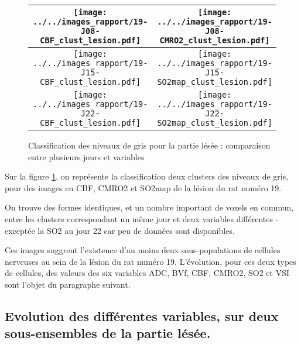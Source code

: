 \begin{figure}[!p]
\begin{center}
\begin{tabular}{|c|c|}
\hline
\texttt{[image: ../../images\_rapport/19-J08-CBF\_clust\_lesion.pdf]}
&
\texttt{[image: ../../images\_rapport/19-J08-CMRO2\_clust\_lesion.pdf]}
\\
\hline
\texttt{[image: ../../images\_rapport/19-J15-CBF\_clust\_lesion.pdf]}
&
\texttt{[image: ../../images\_rapport/19-J15-SO2map\_clust\_lesion.pdf]}
\\
\hline
\texttt{[image: ../../images\_rapport/19-J22-CBF\_clust\_lesion.pdf]}
&
\texttt{[image: ../../images\_rapport/19-J22-SO2map\_clust\_lesion.pdf]}
\\
\hline
\end{tabular}
\end{center}
\caption{Classification des niveaux de gris pour la partie l\'es\'ee : comparaison entre plusieurs jours et variables}
\label{19_reg_clust_les}
\end{figure}

Sur la figure \ref{19_reg_clust_les}, on repr\'esente la classification  deux clusters des niveaux de gris, %
pour des images en CBF, CMRO2 et SO2map de la l\'esion du rat num\'ero 19.

\par
On trouve des formes identiques, et un nombre important de voxels en commun, entre les clusters correspondant  un m\^eme jour et deux variables diff\'erentes %
-except\'ee la SO2 au jour 22 car peu de donn\'ees sont disponibles.

\par
Ces images suggrent l'existence d'au moins deux sous-populations de cellules nerveuses au sein de la l\'esion du rat num\'ero 19. %
L'\'evolution, pour ces deux types de cellules, des valeurs des six variables ADC, BVf, CBF, CMRO2, SO2 et VSI sont l'objet du paragraphe suivant.

\FloatBarrier
\subsection{Evolution des diff\'erentes variables, sur deux sous-ensembles de la partie l\'es\'ee.}%

